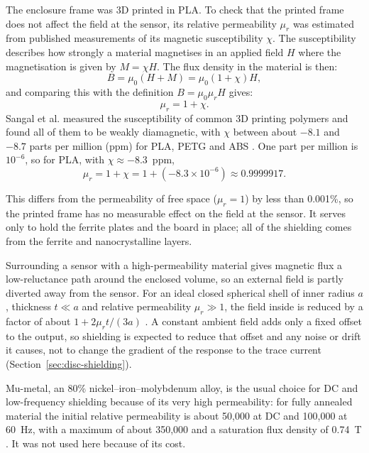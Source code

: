 \documentclass[12pt,a4paper]{article}
\begin{document}
The enclosure frame was 3D printed in PLA. To check that the printed frame does not affect the field at the sensor, its relative permeability $\mu_r$ was estimated from published measurements of its magnetic susceptibility $\chi$. The susceptibility describes how strongly a material magnetises in an applied field $H$ where the magnetisation is given by $M = \chi H$. The flux density in the material is then:
\begin{equation}
B = \mu_0 (H + M) = \mu_0 (1 + \chi) H,
\label{eq:susceptibility}
\end{equation}
and comparing this with the definition $B = \mu_0 \mu_r H$ gives:
\begin{equation}
\mu_r = 1 + \chi .
\label{eq:mur-chi}
\end{equation}
Sangal et al. measured the susceptibility of common 3D printing polymers and found all of them to be weakly diamagnetic, with $\chi$ between about $-8.1$ and $-8.7$ parts per million (ppm) for PLA, PETG and ABS \cite{sangal2023}. One part per million is $10^{-6}$, so for PLA, with $\chi \approx -8.3$~ppm,
\begin{equation}
\mu_r = 1 + \chi = 1 + \left(-8.3 \times 10^{-6}\right) \approx 0.9999917 .
\label{eq:mur-pla}
\end{equation}

This differs from the permeability of free space ($\mu_r = 1$) by less than 0.001\%, so the printed frame has no measurable effect on the field at the sensor. It serves only to hold the ferrite plates and the board in place; all of the shielding comes from the ferrite and nanocrystalline layers.

 Surrounding a sensor with a high-permeability material gives magnetic flux a low-reluctance path around the enclosed volume, so an external field is partly diverted away from the sensor. For an ideal closed spherical shell of inner radius $a$, thickness $t \ll a$ and relative permeability $\mu_r \gg 1$, the field inside is reduced by a factor of about $1 + 2\mu_r t/(3a)$ \cite{fitzpatrick_shielding}. A constant ambient field adds only a fixed offset to the output, so shielding is expected to reduce that offset and any noise or drift it causes, not to change the gradient of the response to the trace current (Section~\ref{sec:disc-shielding}).

Mu-metal, an 80\% nickel--iron--molybdenum alloy, is the usual choice for DC and low-frequency shielding because of its very high permeability: for fully annealed material the initial relative permeability is about 50{,}000 at DC and 100{,}000 at \SI{60}{\hertz}, with a maximum of about 350{,}000 and a saturation flux density of \SI{0.74}{\tesla} \cite{msc_mumetal}. It was not used here because of its cost.
\end{document}

